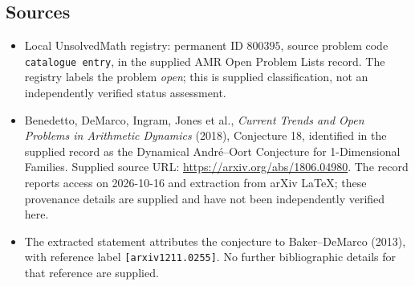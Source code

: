 \documentclass[11pt]{article}
\begin{document}
\subsection{Sources}
\begin{itemize}
\item Local UnsolvedMath registry: permanent ID \(800395\), source problem code \texttt{catalogue entry}, in the supplied AMR Open Problem Lists record. The registry labels the problem \emph{open}; this is supplied classification, not an independently verified status assessment.
\item Benedetto, DeMarco, Ingram, Jones et al., \emph{Current Trends and Open Problems in Arithmetic Dynamics} (2018), Conjecture 18, identified in the supplied record as the Dynamical Andr\'{e}--Oort Conjecture for 1-Dimensional Families. Supplied source URL: \url{https://arxiv.org/abs/1806.04980}. The record reports access on 2026-10-16 and extraction from arXiv LaTeX; these provenance details are supplied and have not been independently verified here.
\item The extracted statement attributes the conjecture to Baker--DeMarco (2013), with reference label \texttt{[arxiv1211.0255]}. No further bibliographic details for that reference are supplied.
\end{itemize}
\end{document}
